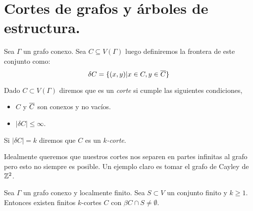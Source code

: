 \documentclass[tesis.tex]{subfiles}
\begin{document}
\chapter{Cortes de grafos y árboles de estructura.}

\begin{deff}
	Sea $\Gamma$ un grafo conexo. 
	Sea $C \subseteq V(\Gamma)$ luego definiremos la frontera de este conjunto como:	
	\[
	\delta C = \{  (x,y) | x \in C, y \in \overline C    \}
	\]
\end{deff}


\begin{deff}
	Dado $C \subset V(\Gamma)$ diremos que es un \emph{corte} si cumple las siguientes condiciones,
	\begin{itemize}
		\item $C$ y $\overline C$ son conexos y no vacíos.
		\item $|\delta C| \le \infty$.
	\end{itemize}
	Si $|\delta C| = k$ diremos que $C$ es un \emph{$k$-corte}.
\end{deff}	

Idealmente queremos que nuestros cortes nos separen en partes infinitas al grafo pero esto no siempre es posible.
Un ejemplo claro es tomar el grafo de Cayley de $\mathbb{Z}^2$.
	
\begin{lema}\label{lema_finitos_kcortes}
	Sea $\Gamma$ un grafo conexo y localmente finito.
	Sea $S \subset V$ un conjunto finito y $k\ge 1$.
	Entonces existen finitos $k$-cortes $C$ con $\beta C \cap S \neq \emptyset$.
\end{lema}	
\end{document}
